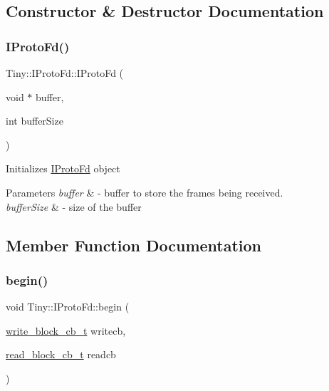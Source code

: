 \subsection{Constructor \& Destructor Documentation}
\mbox{\label{classTiny_1_1IProtoFd_a65976c6faaf41504b7c15036edc054cf}} 
\subsubsection{\texorpdfstring{I\+Proto\+Fd()}{IProtoFd()}}
{\footnotesize\ttfamily Tiny\+::\+I\+Proto\+Fd\+::\+I\+Proto\+Fd (\begin{DoxyParamCaption}\item[{void $\ast$}]{buffer,  }\item[{int}]{buffer\+Size }\end{DoxyParamCaption})\hspace{0.3cm}{\ttfamily [inline]}}

Initializes \hyperlink{classTiny_1_1IProtoFd}{I\+Proto\+Fd} object 
\begin{DoxyParams}{Parameters}
{\em buffer} & -\/ buffer to store the frames being received. \\
\hline
{\em buffer\+Size} & -\/ size of the buffer \\
\hline
\end{DoxyParams}


\subsection{Member Function Documentation}
\mbox{\label{classTiny_1_1IProtoFd_aae4e613316866105c130d613ecb25dd4}} 
\subsubsection{\texorpdfstring{begin()}{begin()}}
{\footnotesize\ttfamily void Tiny\+::\+I\+Proto\+Fd\+::begin (\begin{DoxyParamCaption}\item[{\hyperlink{tiny__types_8h_aafd634660bba76cace57a8f9b01e044d}{write\+\_\+block\+\_\+cb\+\_\+t}}]{writecb,  }\item[{\hyperlink{tiny__types_8h_a15bec127d9ee63658563d62e92b5261b}{read\+\_\+block\+\_\+cb\+\_\+t}}]{readcb }\end{DoxyParamCaption})}

